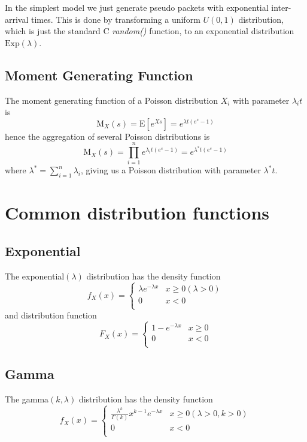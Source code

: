 In the simplest model we just generate pseudo packets with exponential
inter-arrival times.  This is done by transforming a uniform $U(0,1)$
distribution, which is just the standard C {\em random()} function, to
an exponential distribution $\mbox{Exp}(\lambda)$.

\subsection{Moment Generating Function}

The moment generating function of a Poisson distribution $X_i$ with
parameter $\lambda_i t$ is
\[
\mbox{M}_X(s) = \mbox{E}[e^{Xs}] = e^{\lambda t(e^s - 1)}
\]
hence the aggregation of several Poisson distributions is
\[ \mbox{M}_X(s) = \prod_{i=1}^n{e^{\lambda_i t(e^s-1)}} =
e^{\lambda^* t(e^s-1)} \]
where $\lambda^* = \sum_{i=1}^n{\lambda_i}$, giving us a Poisson
distribution with parameter $\lambda^*t$.

\section{Common distribution functions}

\subsection{Exponential}
\label{append:expon}

The exponential$(\lambda)$ distribution has the density function
\[ f_X(x) = \left\{ \begin{array}{ll}
\lambda e^{-\lambda x} & x \geq 0 (\lambda > 0)\\
0 & x < 0 \\
\end{array} \right.
 \]
and distribution function
\[ F_X(x) =
\left\{\begin{array}{ll}
1 - e^{-\lambda x} & x \geq 0 \\
0 & x < 0 \\
\end{array} \right.
\]

\subsection{Gamma}

The gamma$(k, \lambda)$ distribution has the density function
\[
f_X(x) =
\left\{ \begin{array}{ll}
\frac{\lambda^k}{\Gamma(k)}x^{k-1}e^{- \lambda x} & x \geq 0 (\lambda > 0, k > 0) \\
0 & x < 0 \\
\end{array} \right.
\]

